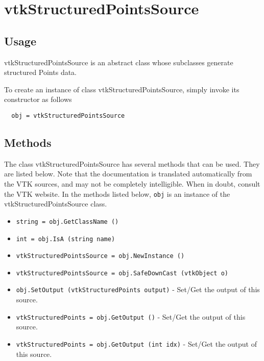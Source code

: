 \section{vtkStructuredPointsSource}

\subsection{Usage}

 vtkStructuredPointsSource is an abstract class whose subclasses generate
 structured Points data.

To create an instance of class vtkStructuredPointsSource, simply
invoke its constructor as follows
\begin{verbatim}
  obj = vtkStructuredPointsSource
\end{verbatim}
\subsection{Methods}

The class vtkStructuredPointsSource has several methods that can be used.
  They are listed below.
Note that the documentation is translated automatically from the VTK sources,
and may not be completely intelligible.  When in doubt, consult the VTK website.
In the methods listed below, \verb|obj| is an instance of the vtkStructuredPointsSource class.
\begin{itemize}
\item  \verb|string = obj.GetClassName ()|

\item  \verb|int = obj.IsA (string name)|

\item  \verb|vtkStructuredPointsSource = obj.NewInstance ()|

\item  \verb|vtkStructuredPointsSource = obj.SafeDownCast (vtkObject o)|

\item  \verb|obj.SetOutput (vtkStructuredPoints output)| -  Set/Get the output of this source.

\item  \verb|vtkStructuredPoints = obj.GetOutput ()| -  Set/Get the output of this source.

\item  \verb|vtkStructuredPoints = obj.GetOutput (int idx)| -  Set/Get the output of this source.

\end{itemize}
